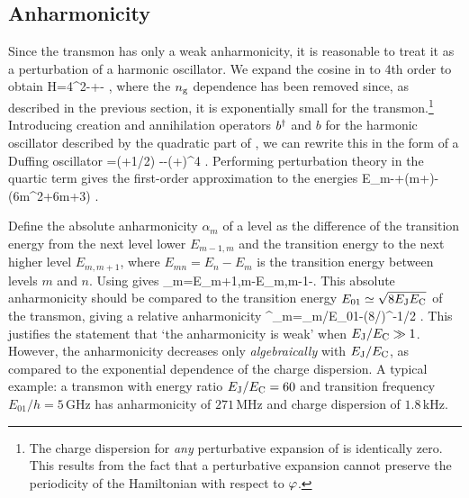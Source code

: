 \subsection{Anharmonicity}
\label{sec:anharm}
Since the transmon has only a weak anharmonicity, it is reasonable to treat it as a perturbation of a harmonic oscillator. We expand the cosine in  to 4th order to obtain
\be
    \label{eq:hamtrans1}
    H=4\EC\nh^2-\EJ+- ,
\ee
where the $n_{\text{g}}$ dependence has been removed since, as described in the previous section, it is exponentially small for the transmon.\footnote{The charge dispersion for \emph{any} perturbative expansion of  is identically zero. This results from the fact that a perturbative expansion cannot preserve the periodicity of the Hamiltonian with respect to ${\varphi}$.} Introducing creation and annihilation operators $b^{\dag}$ and $b$ for the harmonic oscillator described by the quadratic part of , we can rewrite this in the form of a Duffing oscillator
\be
    \label{eq:pert1}
    =\sqrt{\smash[b]{8\EC\EJ}}\bigl(\dg{}+1/2\bigr)
        -\EJ-\bigl(\dg+)^4 .
\ee%
%
Performing perturbation theory in the quartic term gives the first-order approximation to the energies
\be
    E_m\simeq-\EJ+\sqrt{\smash[b]{8\EJ\EC}}\left(m+\right)-\left(6m^2+6m+3\right) .
\ee

Define the absolute anharmonicity $\alpha_m$ of a level as the difference of the transition energy from the next level lower $E_{m-1,m}$ and the transition energy to the next higher level $E_{m,m+1}$, where $E_{mn}=E_n-E_m$ is the transition energy between levels $m$ and $n$. Using  gives
\be
    \label{eq:cpbanharmabs}
    \alpha_m=E_{m+1,m}-E_{m,m-1}\simeq-\EC .
\ee%
This absolute anharmonicity should be compared to the transition energy $E_{01}\simeq\sqrt{\smash[b]{8E_{\text{J}}E_{\text{C}}}}$ of the transmon, giving a relative anharmonicity
\be
    \label{eq:cpbanharmrel}
    \alpha^_m=\alpha_m/E_{01}\simeq-(8\EJ/\EC)^{-1/2} .
\ee
This justifies the statement that `the anharmonicity is weak' when $E_{\text{J}}/E_{\text{C}}\gg1$. However, the anharmonicity decreases only \emph{algebraically} with $E_{\text{J}}/E_{\text{C}}$, as compared to the exponential dependence of the charge dispersion. A typical example: a transmon with energy ratio $E_{\text{J}}/E_{\text{C}}=60$ and transition frequency $E_{01}/h=5\,\text{GHz}$ has anharmonicity of $271\,\text{MHz}$ and charge dispersion of $1.8\,\text{kHz}$.

